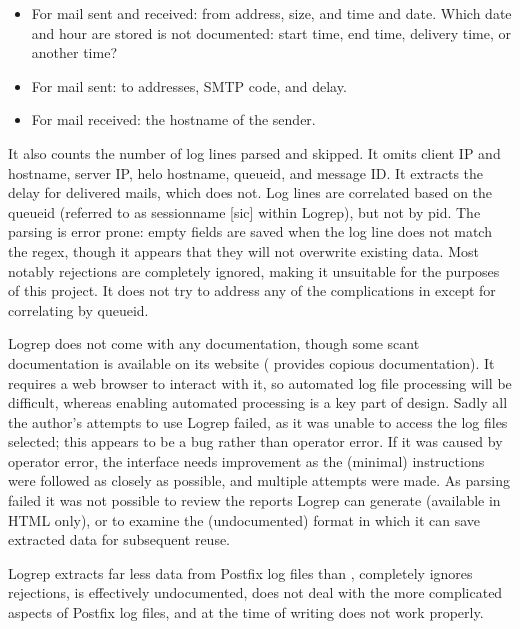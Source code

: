 \begin{itemize}

    \item For mail sent and received: from address, size, and time and
        date.  Which date and hour are stored is not documented: start
        time, end time, delivery time, or another time?

    \item For mail sent: to addresses, \gls{SMTP} code, and delay.

    \item For mail received: the hostname of the sender.

\end{itemize}

It also counts the number of log lines parsed and skipped.  It omits client
\gls{IP} and hostname, server \gls{IP}, helo hostname, queueid, and message
ID\@.  It extracts the delay for delivered mails, which \parsername{} does
not.  Log lines are correlated based on the queueid (referred to as
sessionname [sic] within Logrep), but not by \gls{pid}.  The parsing is
error prone: empty fields are saved when the log line does not match the
regex, though it appears that they will not overwrite existing data.  Most
notably rejections are completely ignored, making it unsuitable for the
purposes of this project.  It does not try to address any of the
complications in  except for correlating by
queueid.

Logrep does not come with any documentation, though some scant
documentation is available on its website (\parsername{} provides copious
documentation).  It requires a web browser to interact with it, so
automated log file processing will be difficult, whereas enabling automated
processing is a key part of \parsernames{} design.  Sadly all the author's
attempts to use Logrep failed, as it was unable to access the log files
selected; this appears to be a bug rather than operator error.  If it was
caused by operator error, the interface needs improvement as the (minimal)
instructions were followed as closely as possible, and multiple attempts
were made.  As parsing failed it was not possible to review the reports
Logrep can generate (available in HTML only), or to examine the
(undocumented) format in which it can save extracted data for subsequent
reuse.

Logrep extracts far less data from Postfix log files than \parsername{},
completely ignores rejections, is effectively undocumented, does not deal
with the more complicated aspects of Postfix log files, and at the time of
writing does not work properly.

